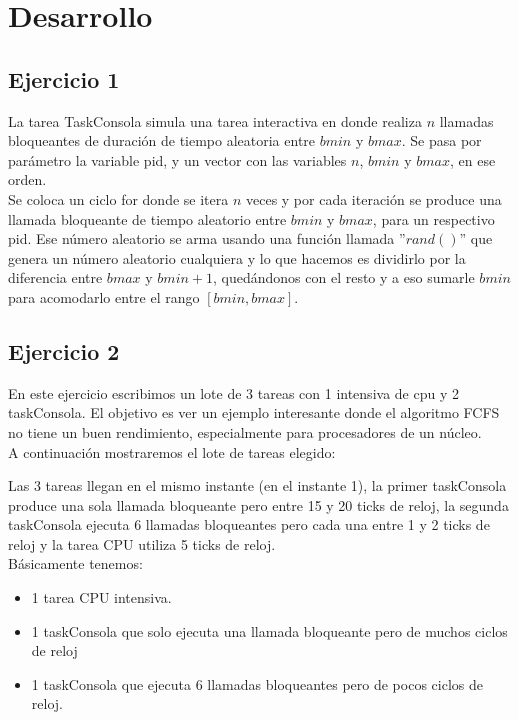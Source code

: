\section{Desarrollo}

\subsection{Ejercicio 1}

La tarea TaskConsola simula una tarea interactiva en donde realiza $n$ llamadas bloqueantes de duración de tiempo aleatoria entre $bmin$ y $bmax$. Se pasa por parámetro la variable pid, y un vector con las variables $n$, $bmin$ y $bmax$, en ese orden. \\

Se coloca un ciclo for donde se itera $n$ veces y por cada iteración se produce una llamada bloqueante de tiempo aleatorio entre $bmin$ y $bmax$, para un respectivo pid. Ese número aleatorio se arma usando una función llamada ''$rand()$'' que genera un número aleatorio cualquiera y lo que hacemos es dividirlo por la diferencia entre $bmax$ y $bmin + 1$, quedándonos con el resto y a eso sumarle $bmin$ para acomodarlo entre el rango $[bmin, bmax]$. \\


\subsection{Ejercicio 2}

En este ejercicio escribimos un lote de 3 tareas con 1 intensiva de cpu y 2 taskConsola. 
El objetivo es ver un ejemplo interesante donde el algoritmo FCFS no tiene un buen rendimiento,
especialmente para procesadores de un núcleo. \\

\noindent
A continuación mostraremos el lote de tareas elegido:


Las 3 tareas llegan en el mismo instante (en el instante 1), la primer taskConsola produce una sola llamada bloqueante pero entre 15 y 20 ticks de reloj, la segunda taskConsola ejecuta 6 llamadas bloqueantes pero cada una entre 1 y 2 ticks de reloj y la tarea CPU utiliza 5 ticks de reloj. \\

Básicamente tenemos:
\begin{itemize}
	\item 1 tarea CPU intensiva.
	\item 1 taskConsola que solo ejecuta una llamada bloqueante pero de muchos ciclos de reloj
	\item 1 taskConsola que ejecuta 6 llamadas bloqueantes pero de pocos ciclos de reloj.
\end{itemize}

